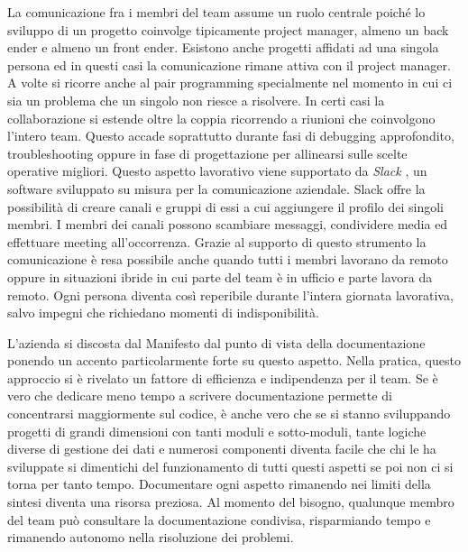 \documentclass[target=bach,aauheader=,style=]{thud}
\begin{document}
La comunicazione fra i membri del team assume un ruolo centrale poiché lo sviluppo di un progetto coinvolge tipicamente project manager, almeno un back ender e almeno un
front ender. Esistono anche progetti affidati ad una singola persona ed in questi casi la comunicazione rimane attiva con il project manager.
A volte si ricorre anche al pair programming specialmente nel momento in cui ci sia un problema che un singolo non riesce a risolvere. In certi casi la collaborazione si estende oltre la
coppia ricorrendo a riunioni che coinvolgono l'intero team. Questo accade soprattutto durante fasi di debugging approfondito, troubleshooting oppure in fase di progettazione per
allinearsi sulle scelte operative migliori.
Questo aspetto lavorativo viene supportato da \textit{Slack} \cite{slack}, un software sviluppato su misura per la comunicazione aziendale.
Slack offre la possibilità di creare canali e gruppi di essi a cui aggiungere il profilo dei singoli membri. I membri dei canali possono scambiare messaggi, condividere media ed effettuare meeting
all'occorrenza. Grazie al supporto di questo strumento la comunicazione è resa possibile anche quando tutti i membri lavorano da remoto oppure in situazioni ibride in cui parte del team è in
ufficio e parte lavora da remoto. Ogni persona diventa così reperibile durante l'intera giornata lavorativa, salvo impegni che richiedano momenti di indisponibilità.

L'azienda si discosta dal Manifesto dal punto di vista della documentazione ponendo un accento particolarmente forte su questo aspetto. Nella pratica, questo approccio si è rivelato un fattore di efficienza
e indipendenza per il team. Se è vero che dedicare meno tempo a scrivere documentazione permette di concentrarsi maggiormente sul codice, è anche vero che se si stanno sviluppando progetti di grandi
dimensioni con tanti moduli e sotto-moduli, tante logiche diverse di gestione dei dati e numerosi componenti diventa facile che chi le ha sviluppate si dimentichi del funzionamento di
tutti questi aspetti se poi non ci si torna per tanto tempo. Documentare ogni aspetto rimanendo nei limiti della sintesi diventa una risorsa preziosa.
Al momento del bisogno, qualunque membro del team può consultare la documentazione condivisa, risparmiando tempo e rimanendo autonomo nella risoluzione dei problemi.
\end{document}
